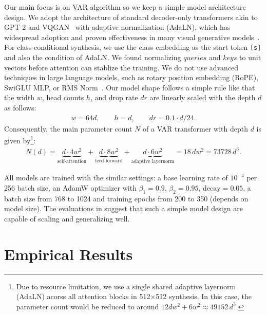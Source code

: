 Our main focus is on VAR algorithm so we keep a simple model architecture design.
We adopt the architecture of standard decoder-only transformers akin to GPT-2 and VQGAN~\cite{gpt2,vqgan} with adaptive normalization (AdaLN), which has widespread adoption and proven effectiveness in many visual generative models~\cite{stylegan,stylegan2,stylegan3,stylegan-xl,stylegan-t,gigagan,dit,chen2023pixart}.
For class-conditional synthesis, we use the class embedding as the start token \texttt{[s]} and also the condition of AdaLN.
We found normalizing $queries$ and $keys$ to unit vectors before attention can stablize the training.
We do not use advanced techniques in large language models, such as rotary position embedding (RoPE), SwiGLU MLP, or RMS Norm~\cite{llama1,llama2}.
Our model shape follows a simple rule like \cite{scalinglaw} that the width $w$, head counts $h$, and drop rate $dr$ are linearly scaled with the depth $d$ as follows:
\begin{align}
    w = 64d,\quad\quad h = d,\quad\quad dr = 0.1\cdot d/24.
\end{align}\vspace{-3pt}
Consequently, the main parameter count $N$ of a VAR transformer with depth $d$ is given by\footnote{Due to resource limitation, we use a single shared adaptive layernorm (AdaLN) acorss all attention blocks in 512$\times$512 synthesis. In this case, the parameter count would be reduced to around $12dw^2 + 6w^2 \approx 49152\,d^3$.
}:
\vspace{1pt}
\begin{align}
    N(d) = \underbrace{d\cdot4w^2}_\text{self-attention} + \underbrace{d\cdot8w^2}_\text{feed-forward} + \underbrace{d\cdot6w^2}_\text{adaptive layernorm} = 18\,dw^2 = 73728\,d^3. \label{eq:param}
\end{align}\vspace{-4pt}

All models are trained with the similar settings: a base learning rate of $10^{-4}$ per 256 batch size, an AdamW optimizer with $\beta_1=0.9$, $\beta_2=0.95$, $\text{decay}=0.05$, a batch size from 768 to 1024 and training epochs from 200 to 350 (depends on model size).
The evaluations in  suggest that such a simple model design are capable of scaling and generalizing well.

    

\section{Empirical Results} \label{sec:exp}
\vspace{-2pt}

